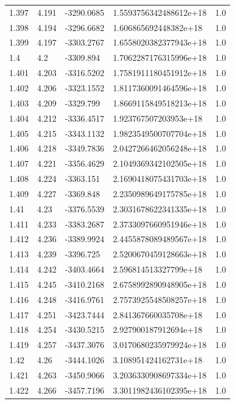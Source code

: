 \begin{tabular}{lllll}
1.397 & 4.191 & -3290.0685 & 1.5593756342488612e+18 & 1.0 \\
1.398 & 4.194 & -3296.6682 & 1.606865692448382e+18 & 1.0 \\
1.399 & 4.197 & -3303.2767 & 1.6558020382377943e+18 & 1.0 \\
1.4 & 4.2 & -3309.894 & 1.7062287176315996e+18 & 1.0 \\
1.401 & 4.203 & -3316.5202 & 1.7581911180451912e+18 & 1.0 \\
1.402 & 4.206 & -3323.1552 & 1.8117360091464596e+18 & 1.0 \\
1.403 & 4.209 & -3329.799 & 1.8669115849518213e+18 & 1.0 \\
1.404 & 4.212 & -3336.4517 & 1.923767507203953e+18 & 1.0 \\
1.405 & 4.215 & -3343.1132 & 1.9823549500707704e+18 & 1.0 \\
1.406 & 4.218 & -3349.7836 & 2.0427266462056248e+18 & 1.0 \\
1.407 & 4.221 & -3356.4629 & 2.1049369342102505e+18 & 1.0 \\
1.408 & 4.224 & -3363.151 & 2.1690418075431703e+18 & 1.0 \\
1.409 & 4.227 & -3369.848 & 2.2350989649175785e+18 & 1.0 \\
1.41 & 4.23 & -3376.5539 & 2.3031678622341335e+18 & 1.0 \\
1.411 & 4.233 & -3383.2687 & 2.3733097660951946e+18 & 1.0 \\
1.412 & 4.236 & -3389.9924 & 2.4455878089489567e+18 & 1.0 \\
1.413 & 4.239 & -3396.725 & 2.5200670459128663e+18 & 1.0 \\
1.414 & 4.242 & -3403.4664 & 2.596814513327799e+18 & 1.0 \\
1.415 & 4.245 & -3410.2168 & 2.6758992890948905e+18 & 1.0 \\
1.416 & 4.248 & -3416.9761 & 2.7573925548508257e+18 & 1.0 \\
1.417 & 4.251 & -3423.7444 & 2.841367660035708e+18 & 1.0 \\
1.418 & 4.254 & -3430.5215 & 2.927900187912694e+18 & 1.0 \\
1.419 & 4.257 & -3437.3076 & 3.0170680235979924e+18 & 1.0 \\
1.42 & 4.26 & -3444.1026 & 3.108951424162731e+18 & 1.0 \\
1.421 & 4.263 & -3450.9066 & 3.2036330908697334e+18 & 1.0 \\
1.422 & 4.266 & -3457.7196 & 3.3011982436102395e+18 & 1.0 \\

\end{tabular}

